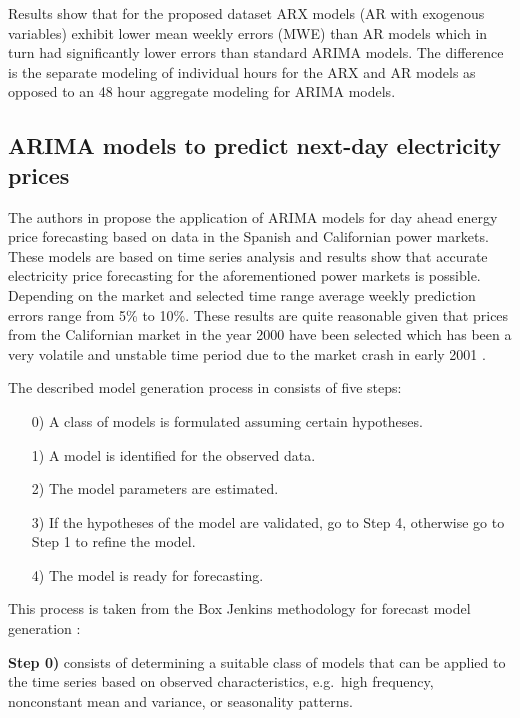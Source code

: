 Results show that for the proposed dataset ARX models (AR with exogenous variables) exhibit lower mean weekly errors (MWE) than AR models which in turn had significantly lower errors than standard ARIMA models. The difference is the separate modeling of individual hours for the ARX and AR models as opposed to an 48 hour aggregate modeling for ARIMA models. 

\subsection{ARIMA models to predict next-day electricity prices} \label{ssec:arima_models_to_predict_next_day_prices}

The authors in \cite{contreras2003arima} propose the application of ARIMA models for day ahead energy price forecasting based on data in the Spanish and Californian power markets. These models are based on time series analysis and results show that accurate electricity price forecasting for the aforementioned power markets is possible. Depending on the market and selected time range average weekly prediction errors 
range from 5\% to 10\%. These results are quite reasonable given that prices from the Californian market in the year 2000 have been selected which has been a very volatile and unstable time period due to the market crash in early 2001 \cite{weron2007modeling}. 

The described model generation process in \cite{contreras2003arima} consists of five steps: 

\begin{itemize}
	\item[0)] A class of models is formulated assuming certain hypotheses.
	\item[1)] A model is identified for the observed data.
	\item[2)] The model parameters are estimated.
	\item[3)] If the hypotheses of the model are validated, go to Step 4, otherwise go to Step 1 to refine the model.
	\item[4)] The model is ready for forecasting.
\end{itemize}

This process is taken from the Box Jenkins methodology for forecast model generation \cite{hibon1997arma}:

\textbf{Step 0)} consists of determining a suitable class of models that can be applied to the time series based on observed characteristics, e.g.~high frequency, nonconstant mean and variance, or seasonality patterns. 

